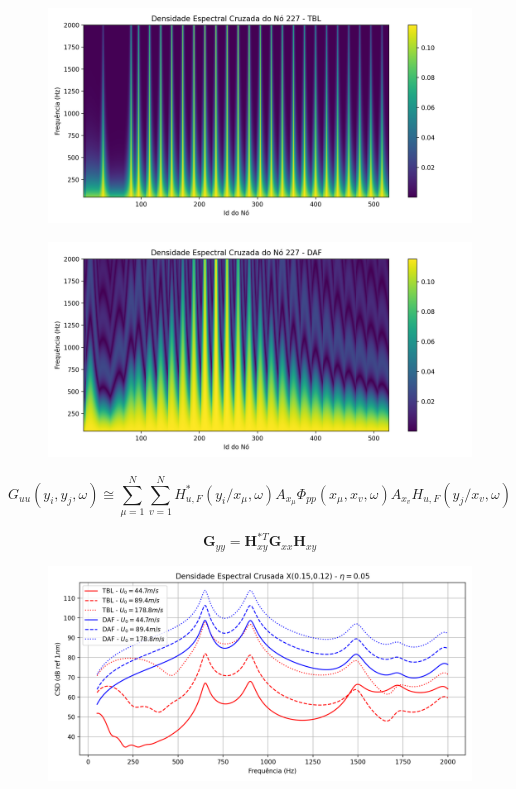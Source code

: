 \documentclass[9pt,a4paper,twoside]{rho-class/rho}
\begin{document}
\begin{figure}[H]
	\centering
	\includegraphics[width=0.9\columnwidth]{figures/csd_TBL.png}
	\caption{}
	\label{fig:csdTBL}
\end{figure}

\begin{figure}[H]
	\centering
	\includegraphics[width=0.9\columnwidth]{figures/csd_DAF.png}
	\caption{}
	\label{fig:csdDAF}
\end{figure}


\begin{equation}
	G_{uu}(y_i,y_j,\omega)\cong\sum_{\mu=1}^N\sum_{v=1}^NH_{u,F}^*(y_i/x_\mu,\omega)A_{x_\mu}\Phi_{pp}(x_\mu,x_v,\omega)A_{x_v}H_{u,F}(y_j/x_v,\omega)
\end{equation}

\begin{equation}
	\mathbf{G}_{yy}=\mathbf{H}_{xy}^{*T}\mathbf{G}_{xx}\mathbf{H}_{xy}
\end{equation}


\begin{figure}[H]
	\centering
	\includegraphics[width=0.9\columnwidth]{figures/csd_vel.png}
	\caption{}
	\label{fig:csdvel}
\end{figure}
\end{document}
